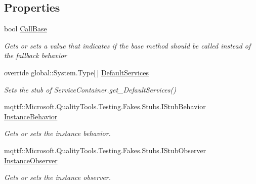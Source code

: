 \subsection*{Properties}
\begin{DoxyCompactItemize}
\item 
bool \hyperlink{class_system_1_1_component_model_1_1_design_1_1_fakes_1_1_stub_service_container_ad72dd70cff6e0e92f69bea240561b390}{Call\-Base}
\begin{DoxyCompactList}\small\item\em Gets or sets a value that indicates if the base method should be called instead of the fallback behavior\end{DoxyCompactList}\item 
override global\-::\-System.\-Type\mbox{[}$\,$\mbox{]} \hyperlink{class_system_1_1_component_model_1_1_design_1_1_fakes_1_1_stub_service_container_a5635a20be83daa579d06debb46615b64}{Default\-Services}
\begin{DoxyCompactList}\small\item\em Sets the stub of Service\-Container.\-get\-\_\-\-Default\-Services()\end{DoxyCompactList}\item 
mqttf\-::\-Microsoft.\-Quality\-Tools.\-Testing.\-Fakes.\-Stubs.\-I\-Stub\-Behavior \hyperlink{class_system_1_1_component_model_1_1_design_1_1_fakes_1_1_stub_service_container_a95f858ccdec752de8b2bfa8ac771fd49}{Instance\-Behavior}
\begin{DoxyCompactList}\small\item\em Gets or sets the instance behavior.\end{DoxyCompactList}\item 
mqttf\-::\-Microsoft.\-Quality\-Tools.\-Testing.\-Fakes.\-Stubs.\-I\-Stub\-Observer \hyperlink{class_system_1_1_component_model_1_1_design_1_1_fakes_1_1_stub_service_container_a8b028dbc4904a5af84eb23023e6b321a}{Instance\-Observer}
\begin{DoxyCompactList}\small\item\em Gets or sets the instance observer.\end{DoxyCompactList}\end{DoxyCompactItemize}


